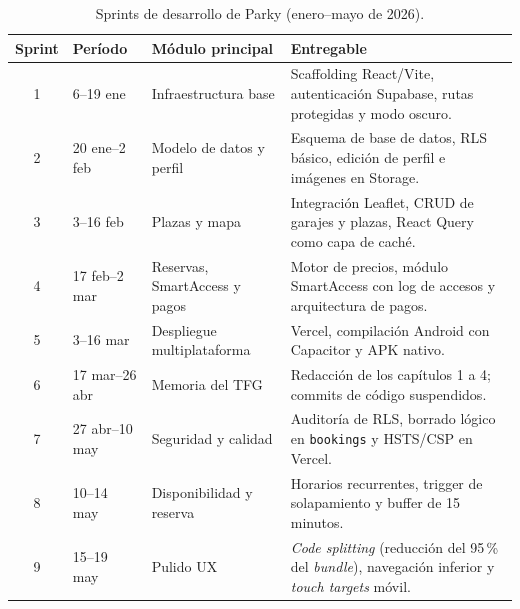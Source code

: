 \begin{table}[h]
  \centering
  \caption{Sprints de desarrollo de Parky (enero--mayo de 2026).}
  \label{tab:sprints}
  \begin{tabularx}{\textwidth}{clXX}
    \toprule
    \textbf{Sprint} & \textbf{Período}    & \textbf{Módulo principal}
                    & \textbf{Entregable}                                                             \\
    \midrule
    \rowcolor{gray!5}
    1               & 6--19 ene           & Infraestructura base          & Scaffolding React/Vite,
    autenticación Supabase, rutas protegidas y modo oscuro.                                           \\
    2               & 20 ene--2 feb       & Modelo de datos y perfil      & Esquema de base de datos,
    RLS básico, edición de perfil e imágenes en Storage.                                              \\
    \rowcolor{gray!5}
    3               & 3--16 feb           & Plazas y mapa                 & Integración Leaflet,
    CRUD de garajes y plazas, React Query como capa de caché.                                         \\
    4               & 17 feb--2 mar       & Reservas, SmartAccess y pagos & Motor de precios, módulo
    SmartAccess con log de accesos y arquitectura de pagos.                                           \\
    \rowcolor{gray!5}
    5               & 3--16 mar           & Despliegue multiplataforma    & Vercel, compilación
    Android con Capacitor y APK nativo.                                                               \\
    6               & 17 mar--26 abr      & Memoria del TFG               & Redacción de los
    capítulos 1 a 4; commits de código suspendidos.                                                   \\
    \rowcolor{gray!5}
    7               & 27 abr--10 may      & Seguridad y calidad           & Auditoría de RLS,
    borrado lógico en \texttt{bookings} y HSTS/CSP en Vercel.                                         \\
    8               & 10--14 may          & Disponibilidad y reserva      & Horarios recurrentes,
    trigger de solapamiento y buffer de 15 minutos.                                                   \\
    \rowcolor{gray!5}
    9               & 15--19 may          & Pulido UX                     & \textit{Code splitting}
    (reducción del 95\,\% del \textit{bundle}), navegación inferior y
    \textit{touch targets} móvil.                                                                     \\
    \bottomrule
  \end{tabularx}
\end{table}

